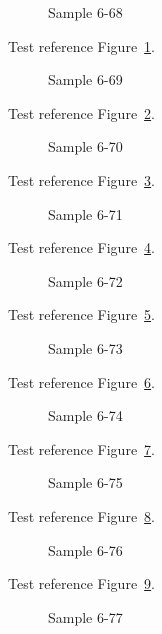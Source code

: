 \begin{figure}[tbhp]
\caption{Sample 6-68}
\label{fig:sample-6-68}
\end{figure}

Test reference Figure~\ref{fig:sample-6-68}.

\begin{figure}[tbhp]
\caption{Sample 6-69}
\label{fig:sample-6-69}
\end{figure}

Test reference Figure~\ref{fig:sample-6-69}.

\begin{figure}[tbhp]
\caption{Sample 6-70}
\label{fig:sample-6-70}
\end{figure}

Test reference Figure~\ref{fig:sample-6-70}.

\begin{figure}[tbhp]
\caption{Sample 6-71}
\label{fig:sample-6-71}
\end{figure}

Test reference Figure~\ref{fig:sample-6-71}.

\begin{figure}[tbhp]
\caption{Sample 6-72}
\label{fig:sample-6-72}
\end{figure}

Test reference Figure~\ref{fig:sample-6-72}.

\begin{figure}[tbhp]
\caption{Sample 6-73}
\label{fig:sample-6-73}
\end{figure}

Test reference Figure~\ref{fig:sample-6-73}.

\begin{figure}[tbhp]
\caption{Sample 6-74}
\label{fig:sample-6-74}
\end{figure}

Test reference Figure~\ref{fig:sample-6-74}.

\begin{figure}[tbhp]
\caption{Sample 6-75}
\label{fig:sample-6-75}
\end{figure}

Test reference Figure~\ref{fig:sample-6-75}.

\begin{figure}[tbhp]
\caption{Sample 6-76}
\label{fig:sample-6-76}
\end{figure}

Test reference Figure~\ref{fig:sample-6-76}.

\begin{figure}[tbhp]
\caption{Sample 6-77}
\label{fig:sample-6-77}
\end{figure}


